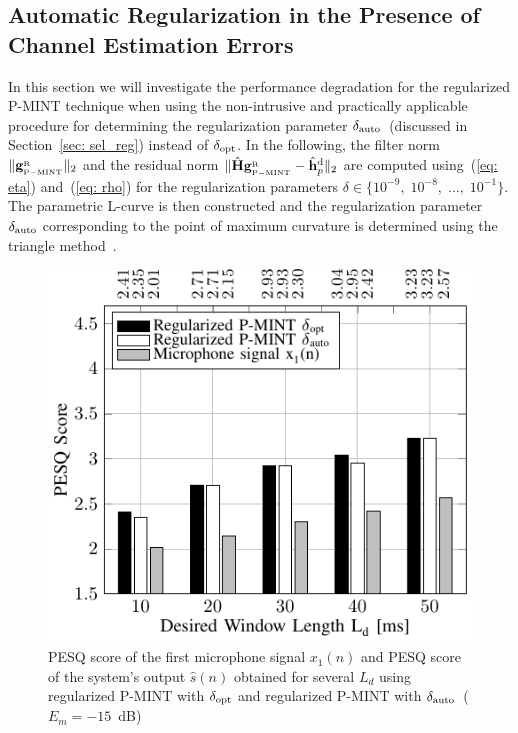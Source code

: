 \documentclass[10pt]{IEEEtran}
\begin{document}
\subsection{Automatic Regularization in the Presence of Channel Estimation Errors}
\label{sec: auto}
In this section we will investigate the performance degradation for the regularized P-MINT technique when using the non-intrusive and practically applicable procedure for determining the regularization parameter $\delta_{\rm auto}$~(discussed in Section~\ref{sec: sel_reg}) instead of $\delta_{\rm opt}$.
In the following, the filter norm $\|\mathbf{g}_{{}_{\rm P-MINT}}^{{_{\rm R}}}\|_2$ and the residual norm $\|\hat{\mathbf{H}}\mathbf{g}_{{}_{\rm P-MINT}}^{{_{\rm R}}} - \hat{\mathbf{h}}_p^{\rm d} \|_2$ are computed using~(\ref{eq: eta}) and~(\ref{eq: rho}) for the regularization parameters $\delta \in \{10^{-9}, \; 10^{-8}, \; \ldots, \; 10^{-1} \}$.
The parametric L-curve is then constructed and the regularization parameter $\delta_{\rm auto}$ corresponding to the point of maximum curvature is determined using the triangle method~\cite{Castellanos_2002}.
\begin{figure}[b!]
  \centering
  \includegraphics[scale=0.9]{figures/PESQ_optandautofixederror_sys_3_error_-15.pdf}
  \caption{PESQ score of the first microphone signal $x_1(n)$ and PESQ score of the system's output $\hat{s}(n)$ obtained for several $L_d$ using regularized P-MINT with $\delta_{\rm opt}$ and regularized P-MINT with $\delta_{\rm auto}$~($E_m = -15$~dB)}
  \label{fig: autopesq1}
\end{figure}
\end{document}
